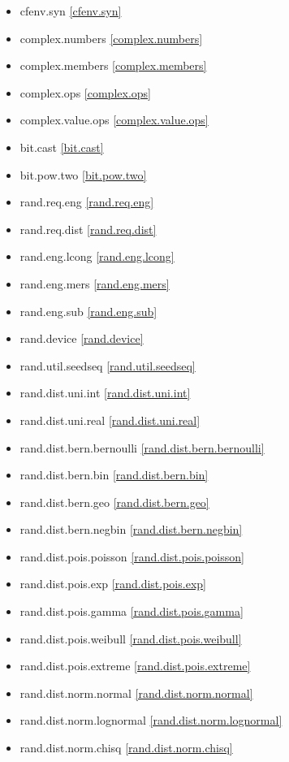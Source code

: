 \begin{multicols}{3}
\begin{itemize}
\item{cfenv.syn}				\ref{cfenv.syn}
\item{complex.numbers}			\ref{complex.numbers}
\item{complex.members}			\ref{complex.members}
\item{complex.ops}				\ref{complex.ops}
\item{complex.value.ops}		\ref{complex.value.ops}
\item{bit.cast}					\ref{bit.cast}
\item{bit.pow.two}				\ref{bit.pow.two}
\item{rand.req.eng}				\ref{rand.req.eng}
\item{rand.req.dist}			\ref{rand.req.dist}
\item{rand.eng.lcong}			\ref{rand.eng.lcong}
\item{rand.eng.mers}			\ref{rand.eng.mers}
\item{rand.eng.sub}				\ref{rand.eng.sub}
\item{rand.device}				\ref{rand.device}
\item{rand.util.seedseq}		\ref{rand.util.seedseq}
\item{rand.dist.uni.int}		\ref{rand.dist.uni.int}
\item{rand.dist.uni.real}		\ref{rand.dist.uni.real}
\item{rand.dist.bern.bernoulli}	\ref{rand.dist.bern.bernoulli}
\item{rand.dist.bern.bin}		\ref{rand.dist.bern.bin}
\item{rand.dist.bern.geo}		\ref{rand.dist.bern.geo}
\item{rand.dist.bern.negbin}	\ref{rand.dist.bern.negbin}
\item{rand.dist.pois.poisson}	\ref{rand.dist.pois.poisson}
\item{rand.dist.pois.exp}		\ref{rand.dist.pois.exp}
\item{rand.dist.pois.gamma}		\ref{rand.dist.pois.gamma}
\item{rand.dist.pois.weibull}	\ref{rand.dist.pois.weibull}
\item{rand.dist.pois.extreme}	\ref{rand.dist.pois.extreme}
\item{rand.dist.norm.normal}	\ref{rand.dist.norm.normal}
\item{rand.dist.norm.lognormal}	\ref{rand.dist.norm.lognormal}
\item{rand.dist.norm.chisq}		\ref{rand.dist.norm.chisq}

\end{itemize}
\end{multicols}
